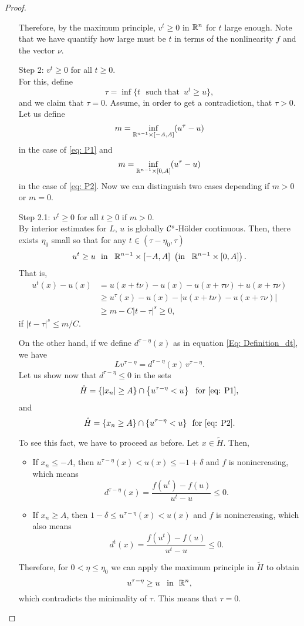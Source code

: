 \begin{proof}
\begin{enumerate}
Therefore, by the maximum principle, $v^t\geq 0$ in $\mathbb{R}^n$ for $t$ large enough. Note that we have quantify how large must be $t$ in terms of the nonlinearity $f$ and the vector $\nu$.

\item[Step 2:] $v^t\geq 0$ for all $t\geq 0$.\\
For this, define 
$$\tau = \inf \{t \,\,\text{ such that }\, u^t\geq u\}, $$ 
and we claim that $\tau=0$. Assume, in order to get a contradiction, that $\tau>0$. Let us define
$$ m = \inf_{\mathbb{R}^{n-1}\times [-A,A]} (u^\tau - u) $$
in the case of \eqref{eq: P1} and
$$ m = \inf_{\mathbb{R}^{n-1}\times [0,A]} (u^\tau - u) $$
in the case of \eqref{eq: P2}. Now we can distinguish two cases depending if $m>0$ or $m=0$.

\item[Step 2.1:] $v^t\geq 0$ for all $t\geq 0$ if $m>0$.\\
By interior estimates for $L$, $u$ is globally $\mathcal{C}^{s}$-H\"older continuous. Then, there exists $\eta_0$ small so that for any $t\in(\tau-\eta_0,\tau)$ 
$$ u^t\geq u \,\,\,\, \textrm{in }\,\,\, \mathbb{R}^{n-1}\times [-A,A] \,\, \left( \textrm{in }\,\,\, \mathbb{R}^{n-1}\times [0,A] \right). $$
That is,
\begin{align*}
u^t(x)-u(x) &= u(x+t\nu)-u(x)-u(x+\tau\nu)+u(x+\tau\nu) \\
& \geq u^\tau(x)-u(x) - |u(x+t\nu)-u(x+\tau\nu)| \\
& \geq m - C|t-\tau|^s \geq 0,
\end{align*}
if $|t-\tau|^s\leq m/C$.

On the other hand, if we define $d^{\tau-\eta}(x)$ as in equation \eqref{Eq: Definition_dt}, we have
$$ L v^{\tau-\eta} = d^{\tau-\eta} (x) \,v^{\tau-\eta}. $$
Let us show now that $d^{\tau-\eta}\leq 0$ in the sets
$$ \hat{H} = \left\{|x_n|\geq A\right\} \cap \left\{u^{\tau-\eta}<u\right\}  \,\,\,\, \textrm{for \eqref{eq: P1}}, $$
and
$$ \hat{H} = \{x_n\geq A\} \cap \{u^{\tau-\eta}<u\}  \,\,\,\, \textrm{for \eqref{eq: P2}}. $$

To see this fact, we have to proceed as before. Let $x\in \tilde{H}$. Then,
\begin{itemize}
\item If $x_n\leq -A$, then $u^{\tau-\eta}(x) < u(x) \leq -1+\delta$ and $f$ is nonincreasing, which means
$$ d^{\tau-\eta}(x) = \frac{f(u^t) - f(u)}{u^t-u} \leq 0.  $$
\item If $x_n\geq A$, then $1-\delta \leq u^{\tau-\eta}(x) < u(x) $ and $f$ is nonincreasing, which also means
$$ d^t(x) = \frac{f(u^t) - f(u)}{u^t-u} \leq 0.  $$
\end{itemize}
Therefore, for $0<\eta \leq \eta_0$ we can apply the maximum principle in $\tilde{H}$ to obtain
$$ u^{\tau-\eta} \geq u \,\,\, \text{ in } \,\, \mathbb{R}^n, $$
which contradicts the minimality of $\tau$. This means that $\tau = 0$.


\end{enumerate}
\end{proof}
